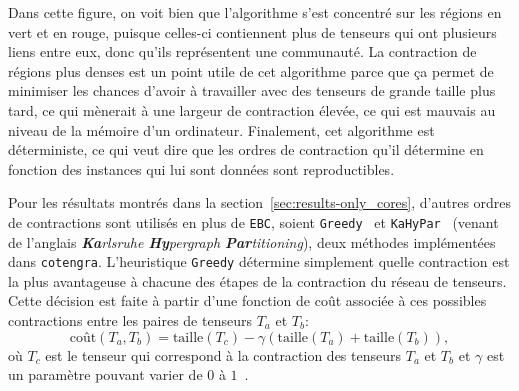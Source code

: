 Dans cette figure, on voit bien que l'algorithme s'est concentré sur les régions en vert et en rouge, puisque celles-ci contiennent plus de tenseurs qui ont plusieurs liens entre eux, donc qu'ils représentent une communauté.
La contraction de régions plus denses est un point utile de cet algorithme parce que ça permet de minimiser les chances d'avoir à travailler avec des tenseurs de grande taille plus tard, ce qui mènerait à une largeur de contraction élevée, ce qui est mauvais au niveau de la mémoire d'un ordinateur.
Finalement, cet algorithme est déterministe, ce qui veut dire que les ordres de contraction qu'il détermine en fonction des instances qui lui sont données sont reproductibles.

Pour les résultats montrés dans la section~\ref{sec:results-only_cores}, d'autres ordres de contractions sont utilisés en plus de \verb|EBC|, soient \verb|Greedy|~\cite{gray_hyper-optimized_2021} et \verb|KaHyPar|~\cite{PhDThesis-kahypar,paper-kahypar} (venant de l'anglais \textit{\textbf{Ka}rlsruhe \textbf{Hy}pergraph \textbf{Par}titioning}), deux méthodes implémentées dans \verb|cotengra|.
L'heuristique \verb|Greedy| détermine simplement quelle contraction est la plus avantageuse à chacune des étapes de la contraction du réseau de tenseurs.
Cette décision est faite à partir d'une fonction de coût associée à ces possibles contractions entre les paires de tenseurs $T_a$ et $T_b$: 
\begin{equation}\label{eq:greedy-cost-function}
    \mathrm{coût}(T_a, T_b) = \mathrm{taille}(T_c) - \gamma(\mathrm{taille}(T_a) + \mathrm{taille}(T_b)),
\end{equation}
où $T_c$ est le tenseur qui correspond à la contraction des tenseurs $T_a$ et $T_b$ et $\gamma$ est un paramètre pouvant varier de $0$ à $1$~\cite{gray_hyper-optimized_2021}.
